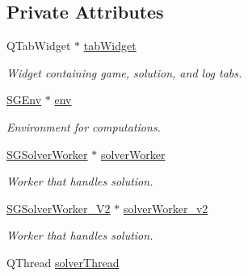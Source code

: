 \subsection*{Private Attributes}
\begin{DoxyCompactItemize}
\item 
\mbox{\label{classSGMainWindow_a817d751fa6091d4b0a6f28bd2c76ce51}} 
Q\+Tab\+Widget $\ast$ \hyperlink{classSGMainWindow_a817d751fa6091d4b0a6f28bd2c76ce51}{tab\+Widget}
\begin{DoxyCompactList}\small\item\em Widget containing game, solution, and log tabs. \end{DoxyCompactList}\item 
\mbox{\label{classSGMainWindow_a09d1290636a995531461fb92a5d87678}} 
\hyperlink{classSGEnv}{S\+G\+Env} $\ast$ \hyperlink{classSGMainWindow_a09d1290636a995531461fb92a5d87678}{env}
\begin{DoxyCompactList}\small\item\em Environment for computations. \end{DoxyCompactList}\item 
\mbox{\label{classSGMainWindow_a1c1cef91745063c8349994394c2f4f6d}} 
\hyperlink{classSGSolverWorker}{S\+G\+Solver\+Worker} $\ast$ \hyperlink{classSGMainWindow_a1c1cef91745063c8349994394c2f4f6d}{solver\+Worker}
\begin{DoxyCompactList}\small\item\em Worker that handles solution. \end{DoxyCompactList}\item 
\mbox{\label{classSGMainWindow_a5b8bebd2fc00ff1b35ca3dd22a446357}} 
\hyperlink{classSGSolverWorker__V2}{S\+G\+Solver\+Worker\+\_\+\+V2} $\ast$ \hyperlink{classSGMainWindow_a5b8bebd2fc00ff1b35ca3dd22a446357}{solver\+Worker\+\_\+v2}
\begin{DoxyCompactList}\small\item\em Worker that handles solution. \end{DoxyCompactList}\item 
\mbox{\label{classSGMainWindow_a71569a2e0e90f5efd8fe3b8d43c71473}} 
Q\+Thread \hyperlink{classSGMainWindow_a71569a2e0e90f5efd8fe3b8d43c71473}{solver\+Thread}

\end{DoxyCompactItemize}
